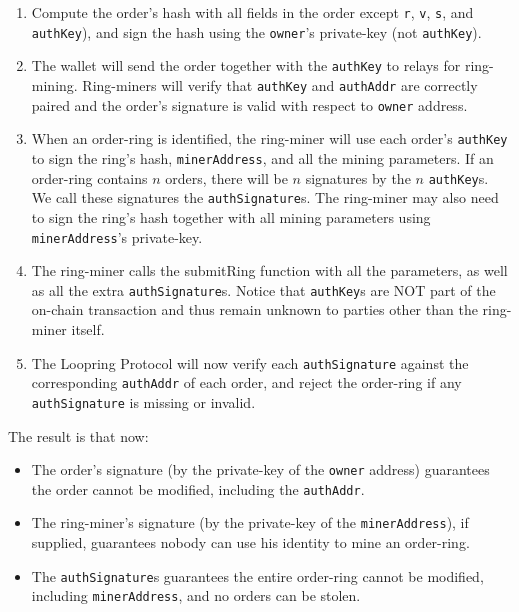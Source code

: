 \documentclass[UTF8,nofonts]{article}
\begin{document}
\begin{multicols}{2}
\begin{enumerate}
\begin{enumerate}
	\item Compute the order's hash with all fields in the order except \verb|r|, \verb|v|, \verb|s|, and \verb|authKey|), and sign the hash using the \verb|owner|'s private-key (not \verb|authKey|).

	\item The wallet will send the order together with the \verb|authKey| to  relays for ring-mining. Ring-miners will verify that \verb|authKey| and \verb|authAddr| are correctly paired and the order's signature is valid with respect to \verb|owner| address.

	\item When an order-ring is identified, the ring-miner will use each order's \verb|authKey| to sign the ring's hash, \verb|minerAddress|, and all the mining parameters. If an order-ring contains $n$ orders, there will be $n$ signatures by the $n$ \verb|authKey|s. We call these signatures the \verb|authSignature|s. The ring-miner may also need to sign the ring's hash together with all mining parameters using \verb|minerAddress|'s private-key.

	\item The ring-miner calls the submitRing function with all the parameters, as well as all the extra \verb|authSignature|s. Notice that \verb|authKey|s are NOT part of the on-chain transaction and thus remain unknown to parties other than the ring-miner itself.


	\item The Loopring Protocol will now verify each \verb|authSignature| against the corresponding \verb|authAddr| of each order, and reject the order-ring if any \verb|authSignature| is missing or invalid.
 
\end{enumerate}

The result is that now:

\begin{itemize}

	\item  The order's signature (by the private-key of the \verb|owner| address) guarantees the order cannot be modified, including the \verb|authAddr|.
	\item  The ring-miner's signature (by the private-key of the \verb|minerAddress|), if supplied, guarantees nobody can use his identity to mine an order-ring.
	\item  The \verb|authSignature|s guarantees the entire order-ring cannot be modified, including \verb|minerAddress|, and no orders can be stolen.


\end{itemize}
\end{enumerate}
\end{multicols}
\end{document}
